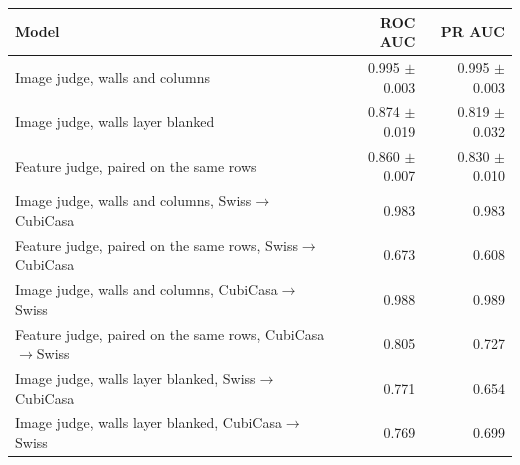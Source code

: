 \begin{tabular}{lrr}
\toprule
Model & ROC AUC & PR AUC \\
\midrule
Image judge, walls and columns & 0.995 $\pm$ 0.003 & 0.995 $\pm$ 0.003 \\
Image judge, walls layer blanked & 0.874 $\pm$ 0.019 & 0.819 $\pm$ 0.032 \\
Feature judge, paired on the same rows & 0.860 $\pm$ 0.007 & 0.830 $\pm$ 0.010 \\
\midrule
Image judge, walls and columns, Swiss$\rightarrow$CubiCasa & 0.983 & 0.983 \\
Feature judge, paired on the same rows, Swiss$\rightarrow$CubiCasa & 0.673 & 0.608 \\
Image judge, walls and columns, CubiCasa$\rightarrow$Swiss & 0.988 & 0.989 \\
Feature judge, paired on the same rows, CubiCasa$\rightarrow$Swiss & 0.805 & 0.727 \\
Image judge, walls layer blanked, Swiss$\rightarrow$CubiCasa & 0.771 & 0.654 \\
Image judge, walls layer blanked, CubiCasa$\rightarrow$Swiss & 0.769 & 0.699 \\
\bottomrule
\end{tabular}